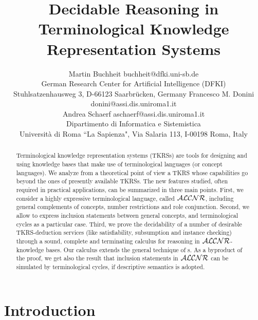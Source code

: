 




\title{Decidable Reasoning in Terminological 
	Knowledge Representation Systems} 

\author{\name  Martin Buchheit
	\email buchheit@dfki.uni-sb.de\\
	\addr 
	German Research Center for
        Artificial Intelligence (DFKI)\\ 
        Stuhlsatzenhausweg 3, D-66123 Saarbr\"ucken, Germany
	\AND
	\name Francesco M. Donini \email donini@assi.dis.uniroma1.it\\
	\name Andrea Schaerf \email aschaerf@assi.dis.uniroma1.it\\
       \addr Dipartimento di Informatica e Sistemistica\\  
      Universit\`a di Roma ``La Sapienza", Via Salaria 113, I-00198 Roma, Italy}

\maketitle


\begin{abstract}
Terminological knowledge representation systems (TKRSs) are tools for designing
and using knowledge bases that make use of terminological languages
(or concept languages).
We analyze from a theoretical point of view a TKRS whose capabilities 
go beyond the ones of presently available TKRSs. The new features studied,
often required in practical applications, can be summarized in three main
points.  First, we consider a highly expressive terminological language, called
${\cal ALCNR}$, including general complements of concepts,  number restrictions and 
role conjunction. Second, we allow to express inclusion statements between
general concepts, and terminological cycles as a particular case.
Third, we prove the decidability of a number of desirable TKRS-deduction services
(like satisfiability, subsumption and instance checking) through a sound,
complete and terminating calculus for reasoning in ${\cal ALCNR}$-knowledge bases. Our
calculus extends the general technique of \cs s.
As a byproduct of the proof, we get also the result that inclusion
statements in ${\cal ALCNR}$ can be simulated by terminological cycles, if
descriptive semantics is adopted.
\end{abstract}


\section{Introduction}\label{sec-introduction}

